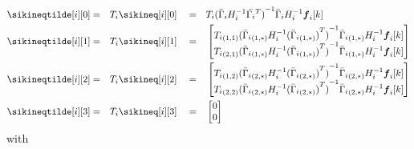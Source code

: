 \documentclass[../main.tex]{subfiles}
\begin{document}
\begin{align}
  \sikineqtilde[i][0]&=&&T_{i}\sikineq[i][0]&&=&&T_{i}{(\linearcoefi)}^{-1}\bar{\Gamma}_{i}H_{i}^{-1}\vec{f}_{i}[k]\\
  \sikineqtilde[i][1]&=&&T_{i} \sikineq[i][1]&&=&& \left[
                                                   \begin{matrix}
                                                     \elem[1,1]{T_{i}}{{(\linearcoefiineqnonzero[1,*])}^{-1}}\elem[1,*]{\bar{\Gamma}_{i}}H_{i}^{-1}\vec{f}_{i}[k]\\
                                                     \elem[2,1]{T_{i}}{{(\linearcoefiineqnonzero[1,*])}^{-1}}\elem[1,*]{\bar{\Gamma}_{i}}H_{i}^{-1}\vec{f}_{i}[k]\\
                                                   \end{matrix}
  \right]\\
  \sikineqtilde[i][2]&=&&T_{i} \sikineq[i][2]&&=&& \left[
                                                   \begin{matrix}
                                                     \elem[1,2]{T_{i}}{{(\linearcoefiineqnonzero[2,*])}^{-1}}\elem[2,*]{\bar{\Gamma}_{i}}H_{i}^{-1}\vec{f}_{i}[k]\\
                                                     \elem[2,2]{T_{i}}{{(\linearcoefiineqnonzero[2,*])}^{-1}}\elem[2,*]{\bar{\Gamma}_{i}}H_{i}^{-1}\vec{f}_{i}[k]\\
                                                   \end{matrix}
  \right]
  \\
  \sikineqtilde[i][3]&=&&T_{i}\sikineq[i][3] &&=&&\left[
                                                   \begin{matrix}
                                                     0\\ 0
                                                   \end{matrix}
  \right]
\end{align}
\pagebreak
with
\end{document}
